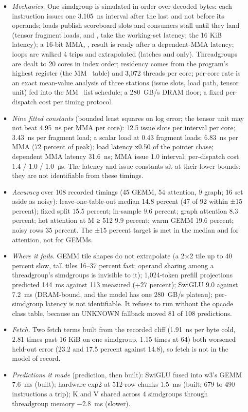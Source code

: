 \begin{itemize}
\item \emph{Mechanics.} One simdgroup is simulated in order over decoded bytes: each instruction issues one 3.105~ns interval
  after the last and not before its operands; loads publish scoreboard slots and consumers stall until they land
  (tensor fragment loads,  and , take the working-set
  latency;  the 16 KiB latency); a 16-bit MMA, , result is ready after a dependent-MMA latency;
  loops are walked 4 trips and extrapolated (latches  and  only). Threadgroups are dealt to 20 cores
  in index order; residency comes from the program's highest register (the MM~ table) and 3,072 threads per
  core; per-core rate is an exact mean-value analysis of three stations (issue slots, load path, tensor unit) fed into
  the MM~ list schedule; a 280~GB/s DRAM floor; a fixed per-dispatch cost per timing protocol.
\item \emph{Nine fitted constants} (bounded least squares on log error; the tensor unit may not beat 4.95~ns per MMA per core):
  12.5 issue slots per interval per core; 3.43~ns per fragment load; a scalar load at 0.43 fragment loads; 6.83~ns per
  MMA (72 percent of peak); load latency x0.50 of the pointer chase; dependent MMA latency 31.6~ns; MMA issue 1.0
  interval; per-dispatch cost 1.4 / 1.0 / 1.0~µs. The latency and issue constants sit at their lower bounds: they are
  not identifiable from these timings.
\item \emph{Accuracy} over 108 recorded timings (45 GEMM, 54 attention, 9 graph; 16 set aside as noisy): leave-one-table-out
  median 14.8 percent (47 of 92 within ±15 percent); fixed split 15.5 percent; in-sample 9.6 percent; graph
  attention 8.3 percent; hot attention at M ≥ 512 9.9 percent; warm GEMM 19.6 percent; noisy rows 35 percent. The
  ±15 percent target is met in the median and for attention, not for GEMMs.
\item \emph{Where it fails.} GEMM tile shapes do not extrapolate (a 2×2 tile up to 40 percent slow, tall tiles 16–37 percent
  fast; operand sharing among a threadgroup's simdgroups is invisible to it); 1,024-token prefill projections predicted
  144~ms against 113 measured (+27 percent); SwiGLU 9.0 against 7.2~ms (DRAM-bound, and the model has one 280~GB/s
  plateau); per-simdgroup latency is not identifiable. It refuses to run without the opcode class table, because an
  UNKNOWN fallback moved 81 of 108 predictions.
\item \emph{Fetch.} Two fetch terms built from the recorded cliff (1.91~ns per byte cold, 2.81 times past 16 KiB on one
  simdgroup, 1.15 times at 64) both worsened held-out error (23.2 and 17.5 percent against 14.8), so fetch is not in
  the model of record.
\item \emph{Predictions it made} (prediction, then built): SwiGLU fused into w3's GEMM 7.6~ms (built); hardware exp2 at 512-row
  chunks 1.5~ms (built; 679 to 490 instructions a trip); K and V shared across 4 simdgroups through threadgroup memory
  −2.8~ms (slower).
\end{itemize}

